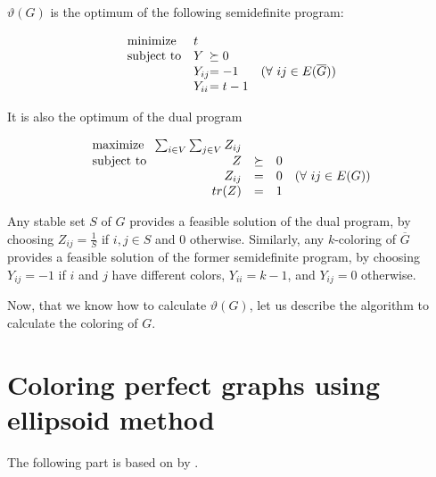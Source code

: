 \begin{theorem}
  $\vartheta(G)$ is the optimum of the following semidefinite program:

  \begin{equation*}
    \begin{array}{ll@{}ll}
      \text{minimize}   & t      &                                              \\
      \text{subject to} & Y      & \succeq 0                                    \\
                        & Y_{ij} & = -1      & (\forall~ij \in E(\overline{G})) \\
                        & Y_{ii} & = t - 1                                      \\
    \end{array}
  \end{equation*}

  It is also the optimum of the dual program

  \begin{equation*}
    \begin{array}{l@{}rlll}
      \text{maximize~~}   & \sum_{i \in V} \sum_{j \in V}  Z_{ij} &                                     \\
      \text{subject to~~} & Z                                     & \succeq & 0                         \\
                          & Z_{ij}                                & =       & 0 & (\forall~ij \in E(G)) \\
                          & tr(Z)                                 & =       & 1                         \\
    \end{array}
  \end{equation*}
\end{theorem}

Any stable set $S$ of $G$ provides a feasible solution of the dual program, by choosing $Z_{ij} = \frac{1}{S}$ if $i, j \in S$ and 0 otherwise. Similarly, any $k$-coloring of $\overline{G}$ provides a feasible solution of the former semidefinite program, by choosing $Y_{ij} = -1$ if $i$ and $j$ have different colors, $Y_{ii} = k-1$, and $Y_{ij} = 0$ otherwise.

Now, that we know how to calculate $\vartheta(G)$, let us describe the algorithm to calculate the coloring of $G$.

\section{Coloring perfect graphs using ellipsoid method}
\label{sec:coloringEllipsoid}
The following part is based on  by \citeauthor{Laurent2005} \cite{Laurent2005}.


